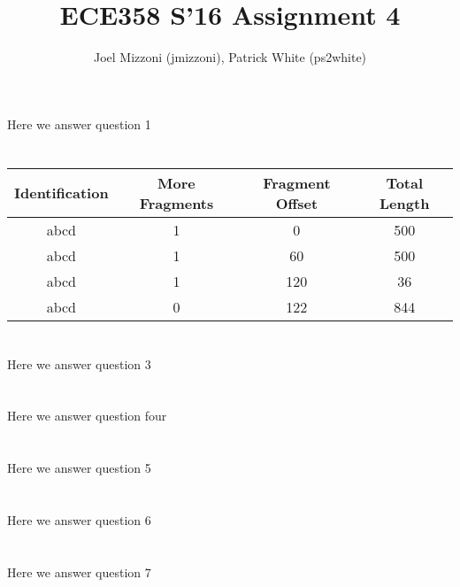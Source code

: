 \documentclass[10pt,a4paper]{article}
\author{Joel Mizzoni (jmizzoni), Patrick White (ps2white)}
\begin{document}
\title{ECE358 S'16 Assignment 4}
\maketitle
\section{}
Here we answer question 1
\section{}
\begin{tabular}{c c c c}
    \toprule
    \textbf{Identification} & \textbf{More Fragments} & \textbf{Fragment Offset} & \textbf{Total Length} \\\midrule
    abcd & 1 & 0 & 500 \\
    abcd & 1 & 60 & 500 \\
    abcd & 1 & 120 & 36 \\
    abcd & 0 & 122 & 844 \\\bottomrule
\end{tabular}
\section{}
Here we answer question 3
\section{}
Here we answer question four
\section{}
Here we answer question 5
\section{}
Here we answer question 6
\section{}
Here we answer question 7
\end{document}
